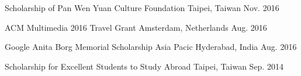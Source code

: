 
\begin{cvhonors}

  \cvhonor
    {Scholarship of Pan Wen Yuan Culture Foundation} %
    {Taipei, Taiwan} %
    {Nov. 2016} %

  \cvhonor
    {ACM Multimedia 2016 Travel Grant} %
    {Amsterdam, Netherlands} %
    {Aug. 2016} %

  \cvhonor
    {Google Anita Borg Memorial Scholarship Asia Pacic} %
    {Hyderabad, India} %
    {Aug. 2016} %

  \cvhonor
    {Scholarship for Excellent Students to Study Abroad} %
    {Taipei, Taiwan} %
    {Sep. 2014} %

\end{cvhonors}

